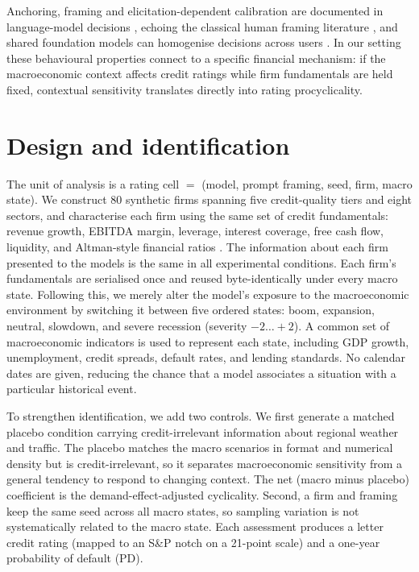 \documentclass[a4paper,fleqn]{cas-sc}
\begin{document}
Anchoring, framing and elicitation-dependent calibration are documented in language-model decisions
\citep{binz2023,kadavath2022}, echoing the classical human framing literature
\citep{tversky1974,tversky1981}, and shared foundation models can homogenise decisions across
users \citep{bommasani2022}. In our setting these behavioural properties
connect to a specific financial mechanism: if the macroeconomic context affects credit ratings while firm
fundamentals are held fixed, contextual sensitivity translates directly into rating procyclicality.

\section{Design and identification}\label{sec:design}
The unit of analysis is a rating cell $=$ (model, prompt framing, seed, firm, macro state). We
construct $80$ synthetic firms spanning five credit-quality tiers and eight sectors, and characterise
each firm using the same set of credit fundamentals: revenue growth, EBITDA margin, leverage, interest
coverage, free cash flow, liquidity, and Altman-style financial ratios \citep{altman1968}. The
information about each firm presented to the models is the same in all experimental conditions. Each
firm's fundamentals are serialised once and reused byte-identically under every macro state. Following
this, we merely alter the model's exposure to the macroeconomic environment by switching it between
five ordered states: boom, expansion, neutral, slowdown, and severe recession (severity
$-2\ldots+2$). A common set of macroeconomic indicators is used to represent each state, including GDP
growth, unemployment, credit spreads, default rates, and lending standards. No calendar dates are
given, reducing the chance that a model associates a situation with a particular historical event.

To strengthen identification, we add two controls. We first generate a matched placebo condition
carrying credit-irrelevant information about regional weather and traffic. The placebo matches the macro scenarios in format and numerical
density but is credit-irrelevant, so it separates macroeconomic sensitivity from a general tendency to
respond to changing context. The net (macro minus placebo) coefficient is the demand-effect-adjusted
cyclicality. Second, a firm and framing keep the same seed across all macro states, so sampling
variation is not systematically related to the macro state. Each assessment produces a letter credit rating (mapped to an
S\&P notch on a 21-point scale) and a one-year probability of default (PD).
\end{document}
